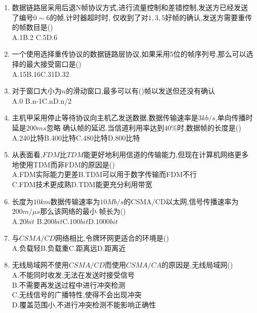 \documentclass[12pt, a4paper, oneside, UTF8]{ctexbook}
\begin{document}
\begin{enumerate}
    \item 数据链路层采用后退N帧协议方式,进行流量控制和差错控制,发送方已经发送了编号$0\sim 6$的帧,计时器超时时,
    仅收到了对$1,3,5$好帧的确认,发送方需要重传的帧数目是() \\
    A.1\qquad B.2 \qquad C.5\qquad D.6

    \item 一个使用选择重传协议的数据链路层协议,如果采用5位的帧序列号,那么可以选择的最大接受窗口是() \\
    A.15\qquad B.16\qquad C.31\qquad D.32

    \item 对于窗口大小为$n$的滑动窗口,最多可以有()帧以发送但还没有确认 \\
    A.0 \qquad B.n-1\qquad C.n\qquad D.n/2 

    \item \bt[1] 主机甲采用停止等待协议向主机乙发送数据,数据传输速率是$3kb/s$,单向传播时延是$200ms$忽略
    确认帧的延迟.当信道利用率达到$40\%$时,数据帧的长度是() \\
    A.240比特\qquad B.400比特\qquad C.480比特\qquad D.800比特

    \item 从表面看,$FDM$比$TDM$能更好地利用信道的传输能力,但现在计算机网络更多地使用TDM而非FDM的原因是() \\
    A.FDM实际能力更差\qquad B.TDM可以用于数字传输而FDM不行 \\
    C.FDM技术更成熟\qquad D.TDM能更充分利用带宽

    \item 长度为$10km$数据传输速率为$10Mb/s$的CSMA/CD以太网,信号传播速率为$200m/\mu s$那么该网络的最小
    帧长为() \\
    A.$20bit$ \qquad B.$200bit$\qquad C.$100bit$\qquad D.$1000bit$
    
    \item 与$CSMA/CD$网络相比,令牌环网更适合的环境是() \\
    A.负载轻\qquad B.负载重\qquad C.距离远\qquad D.距离近

    \item 无线局域网不使用$CSMA/CD$而使用$CSMA/CA$的原因是,无线局域网() \\
    A.不能同时收发,无法在发送时接受信号 \\
    B.不需要再发送过程中进行冲突检测 \\
    C.无线信号的广播特性,使得不会出现冲突 \\
    D.覆盖范围小,不进行冲突检测不能影响正确性 


\end{enumerate}
\end{document}
